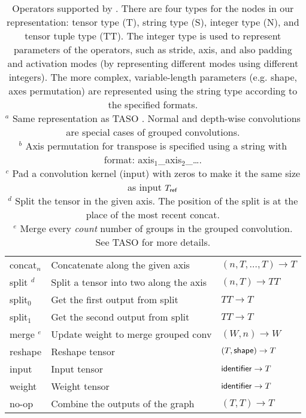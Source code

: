 \begin{table}[t]
\begin{tabular}{lll}
        \sf concat$_n$ & Concatenate along the given axis     & $(n, T, \dots, T) \rightarrow T$ \\
        \sf split $^d$      & Split a tensor into two along the axis & $(n, T) \rightarrow TT$ \\
        \sf split$_0$       & Get the first output from split      & $TT \rightarrow T$ \\
        \sf split$_1$       & Get the second output from split     & $TT \rightarrow T$ \\
        \sf merge $^e$      & Update weight to merge grouped conv  & $(W, n) \rightarrow W$ \\
        \sf reshape         & Reshape tensor                       & $(T, {\sf shape}) \rightarrow T$ \\
        \sf input           & Input tensor                         & ${\sf identifier} \rightarrow T$ \\
        \sf weight          & Weight tensor                        & ${\sf identifier} \rightarrow T$ \\
        \sf no-op            & Combine the outputs of the graph     & $(T, T) \rightarrow T$ \\
    \end{tabular}
    \\[1em]
    \caption{
        Operators supported by \ourname.
        There are four types for the nodes in our representation:
        tensor type (T), string type (S), integer type (N), and tensor tuple type (TT).
        The integer type is used to represent parameters of the
         operators, such as stride, axis, and also padding and activation modes
         (by representing different modes using different integers).
         The more complex, variable-length parameters
          (e.g. shape, axes permutation) are represented using the
          string type according to the specified formats.
          \\[1em]
          \footnotesize{
            $^a$ Same representation as TASO \cite{taso}.
                 Normal and depth-wise convolutions are special cases
                 of grouped convolutions. \\
            $^b$ Axis permutation for transpose is specified
                 using a string with format: axis$_1$\_axis$_2$\_\dots .\\
            $^c$ Pad a convolution kernel (input) with
                 zeros to make it the same size as input $T_{\sf ref}$ \\
            $^d$ Split the tensor in the given axis. The position of the split is at the place of the most recent concat. \\
            $^e$ Merge every \textit{count} number of groups in the grouped convolution. See TASO \cite{taso} for more details. \\
          }
    }\label{table:ops}
\end{table}


